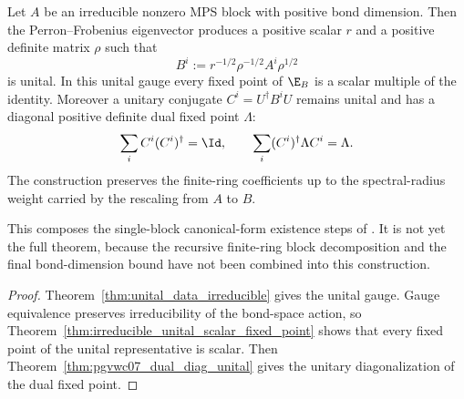\begin{theorem}%
    \label{thm:pgvwc07_irreducible_unital_dual_package}
    \leanok
    Let $A$ be an irreducible nonzero MPS block with positive bond dimension.
    Then the Perron--Frobenius eigenvector produces a positive scalar $r$ and a
    positive definite matrix $\rho$ such that
    \[
        B^i := r^{-1/2}\rho^{-1/2} A^i\rho^{1/2}
    \]
    is unital. In this unital gauge every fixed point of $\E_B$ is a scalar
    multiple of the identity. Moreover a unitary conjugate $C^i=U^\dagger
        B^iU$ remains unital and has a diagonal positive definite dual fixed point
    $\Lambda$:
    \[
        \sum_i C^i(C^i)^\dagger=\Id,
        \qquad
        \sum_i (C^i)^\dagger\Lambda C^i=\Lambda.
    \]
    The construction preserves the finite-ring coefficients up to the
    spectral-radius weight carried by the rescaling from $A$ to $B$.

    This composes the single-block canonical-form existence steps of
    \cite[Theorem~Th:TIcanonical]{PerezGarcia2007Matrix}. It is not yet the
    full theorem, because the recursive finite-ring block decomposition and the
    final bond-dimension bound have not been combined into this construction.
\end{theorem}
\begin{proof}\leanok
    Theorem~\ref{thm:unital_data_irreducible} gives the unital gauge.
    Gauge equivalence preserves irreducibility of the bond-space action, so
    Theorem~\ref{thm:irreducible_unital_scalar_fixed_point} shows that every
    fixed point of the unital representative is scalar. Then
    Theorem~\ref{thm:pgvwc07_dual_diag_unital} gives the unitary
    diagonalization of the dual fixed point.
\end{proof}

